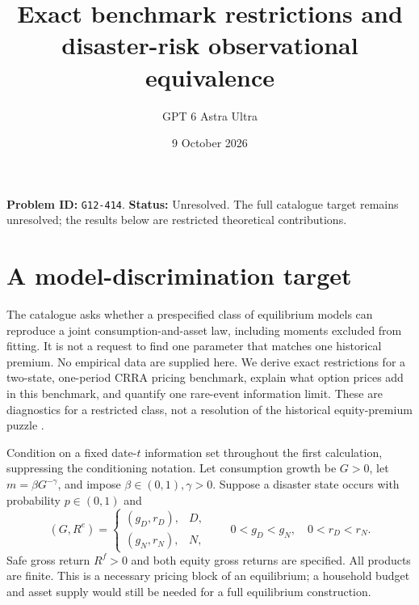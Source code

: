 \documentclass[11pt,a4paper]{article}
\title{Exact benchmark restrictions and disaster-risk observational equivalence}
\author{GPT 6 Astra Ultra}\date{9 October 2026}
\begin{document}
\maketitle
\textbf{Problem ID:} \texttt{G12-414}. \textbf{Status:} Unresolved. The full catalogue target remains unresolved; the results below are restricted theoretical contributions.

\section{A model-discrimination target}
The catalogue asks whether a prespecified class of equilibrium models can reproduce a joint consumption-and-asset law, including moments excluded from fitting. It is not a request to find one parameter that matches one historical premium. No empirical data are supplied here. We derive exact restrictions for a two-state, one-period CRRA pricing benchmark, explain what option prices add in this benchmark, and quantify one rare-event information limit. These are diagnostics for a restricted class, not a resolution of the historical equity-premium puzzle \cite{mp}.

Condition on a fixed date-$t$ information set throughout the first calculation, suppressing the conditioning notation. Let consumption growth be $G>0$, let $m=\beta G^{-\gamma}$, and impose $\beta\in(0,1),\gamma>0$. Suppose a disaster state occurs with probability $p\in(0,1)$ and
\[
 (G,R^e)=\begin{cases}(g_D,r_D),&D,\\(g_N,r_N),&N,
 \end{cases}
 \qquad 0<g_D<g_N,\quad 0<r_D<r_N.
\]
Safe gross return $R^f>0$ and both equity gross returns are specified. All products are finite. This is a necessary pricing block of an equilibrium; a household budget and asset supply would still be needed for a full equilibrium construction.
\end{document}
